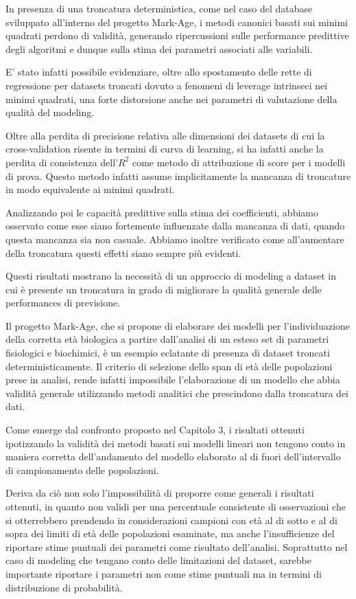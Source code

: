 \documentclass[12pt,openright,twoside,a4paper]{book}
\begin{document}
In presenza di una troncatura deterministica, come nel caso del database sviluppato all'interno del progetto Mark-Age, i metodi canonici basati sui minimi quadrati perdono di validità, generando ripercussioni sulle performance predittive degli algoritmi e dunque sulla stima dei parametri associati alle variabili.

E' stato infatti possibile evidenziare, oltre allo spostamento delle rette di regressione per datasets troncati dovuto a fenomeni di leverage intrinseci nei minimi quadrati, una forte distorsione anche nei parametri di valutazione della qualità del modeling.

Oltre alla perdita di precisione relativa alle dimensioni dei datasets di cui la cross-validation risente in termini di curva di learning, si ha infatti anche la perdita di consistenza dell'$R^2$ come metodo di attribuzione di score per i modelli di prova. Questo metodo infatti assume implicitamente la mancanza di troncature in modo equivalente ai minimi quadrati.

Analizzando poi le capacità predittive sulla stima dei coefficienti, abbiamo osservato come esse siano fortemente influenzate dalla mancanza di dati, quando questa mancanza sia non casuale.
Abbiamo inoltre verificato come all'aumentare della troncatura questi effetti siano sempre più evidenti.

Questi risultati mostrano la necessità di un approccio di modeling a dataset in cui è presente un troncatura in grado di migliorare la qualità generale delle performances di previsione.

Il progetto Mark-Age, che si propone di elaborare dei modelli per l'individuazione della corretta età biologica a partire dall'analisi di un esteso set di parametri fisiologici e biochimici, è un esempio eclatante di presenza di dataset troncati deterministicamente.
Il criterio di selezione dello span di età delle popolazioni prese in analisi, rende infatti impossibile l'elaborazione di un modello che abbia validità generale utilizzando metodi analitici che prescindono dalla troncatura dei dati.

Come emerge dal confronto proposto nel Capitolo 3, i risultati ottenuti ipotizzando la validità dei metodi basati sui modelli lineari non tengono conto in maniera corretta dell'andamento del modello elaborato al di fuori dell'intervallo di campionamento delle popolazioni.

Deriva da ciò non solo l'impossibilità di proporre come generali i risultati ottenuti, in quanto non validi per una percentuale consistente di osservazioni che si otterrebbero prendendo in considerazioni campioni con età al di sotto e al di sopra dei limiti di età delle popolazioni esaminate, ma anche l'insufficienze del riportare stime puntuali dei parametri come risultato dell'analisi. Soprattutto nel caso di modeling che tengano conto delle limitazioni del dataset, sarebbe importante riportare i parametri non come stime puntuali ma in termini di distribuzione di probabilità.
\end{document}
